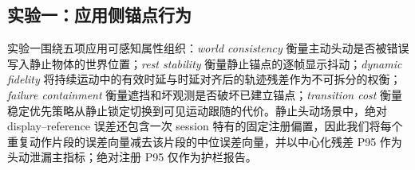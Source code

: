 \subsection{实验一：应用侧锚点行为}

实验一围绕五项应用可感知属性组织：\emph{world consistency} 衡量主动头动是否被错误写入静止物体的世界位置；\emph{rest stability} 衡量静止锚点的逐帧显示抖动；\emph{dynamic fidelity} 将持续运动中的有效时延与时延对齐后的轨迹残差作为不可拆分的权衡；\emph{failure containment} 衡量遮挡和坏观测是否破坏已建立锚点；\emph{transition cost} 衡量稳定优先策略从静止锁定切换到可见运动跟随的代价。静止头动场景中，绝对 display--reference 误差还包含一次 session 特有的固定注册偏置，因此我们将每个重复动作片段的误差向量减去该片段的中位误差向量，并以中心化残差 P95 作为头动泄漏主指标；绝对注册 P95 仅作为护栏报告。

